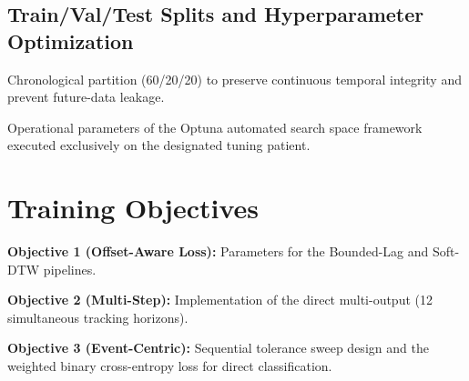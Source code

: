 \subsection{Train/Val/Test Splits and Hyperparameter Optimization} \label{sec:method:setup:splits}
\begin{planned}
    \item Chronological partition (60/20/20) to preserve continuous temporal integrity and prevent future-data leakage.
    \item Operational parameters of the Optuna automated search space framework executed exclusively on the designated tuning patient.
\end{planned}

\section{Training Objectives} \label{sec:method:objectives}
\begin{planned}
    \item \textbf{Objective 1 (Offset-Aware Loss):} Parameters for the Bounded-Lag and Soft-DTW pipelines.
    \item \textbf{Objective 2 (Multi-Step):} Implementation of the direct multi-output (12 simultaneous tracking horizons).
    \item \textbf{Objective 3 (Event-Centric):} Sequential tolerance sweep design and the weighted binary cross-entropy loss for direct classification.
\end{planned}